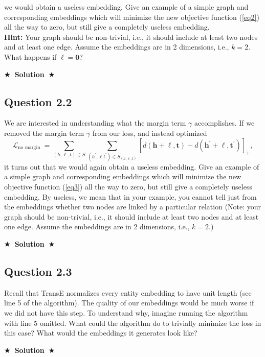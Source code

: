 \documentclass{article}
\newcommand{\Solution}[1]{{\medskip \color{black} \bf $\bigstar$~\sf \textbf{Solution}~$\bigstar$ \sf #1 } \bigskip}
\begin{document}
we would obtain a useless embedding. Give an example of a simple graph and corresponding embeddings which will minimize the new objective function (\ref{eq2}) all the way to zero, but still give a completely useless embedding.\\
\textbf{Hint:} Your graph should be non-trivial, i.e., it should include at least two nodes and at least one edge. Assume the embeddings are in 2 dimensions, i.e., $k = 2$.
What happens if $\boldsymbol{\ell} = \textbf{0}$?

\Solution{}

\subsection*{Question 2.2}
We are interested in understanding what the margin term $\gamma$ accomplishes. If we removed the margin term $\gamma$ from our loss, and instead optimized
\begin{equation}\label{eq3}
\mathcal{L}_{\text {no margin }}=\sum_{(h, \ell, t) \in S} \sum_{\left(h^{\prime}, \ell t^{\prime}\right) \in S_{(h, \ell, t)}^{\prime}}\left[d(\mathbf{h}+\boldsymbol{\ell}, \mathbf{t})-d\left(\mathbf{h}^{\prime}+\boldsymbol{\ell}, \mathbf{t}^{\prime}\right)\right]_{+},
\end{equation}
it turns out that we would again obtain a useless embedding. Give an example of a simple graph and corresponding embeddings which will minimize the new objective function (\ref{eq3}) all the way to zero, but still give a completely useless embedding. By useless, we mean that in your example, you cannot tell just from the embeddings whether two nodes are linked by a particular relation (Note: your graph should be non-trivial, i.e., it should include at least two nodes and at least one edge. Assume the embeddings are in 2 dimensions, i.e., $k=2$.)

\Solution{}

\subsection*{Question 2.3}
Recall that TransE normalizes every entity embedding to have unit length (see line 5 of the algorithm). The quality of our embeddings would be much worse if we did not have this step. To understand why, imagine running the algorithm with line 5 omitted.
What could the algorithm do to trivially minimize the loss in this case? What would the embeddings
it generates look like?

\Solution{}
\end{document}
